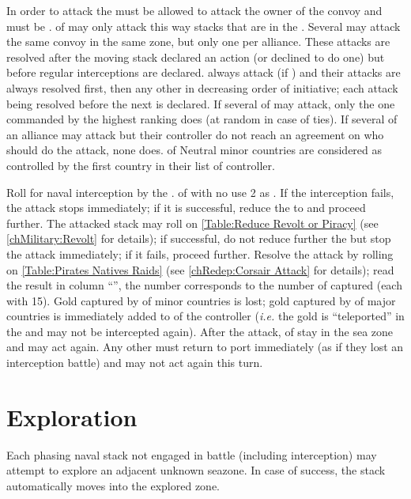 In order to attack the \corsaire must be allowed to attack the owner of the
convoy and must be \Faceplus. \corsaire of \Barbaresques may only attack this
way stacks that are in the . Several \corsaire may attack
the same convoy in the same zone, but only one per alliance. These attacks are
resolved after the moving stack declared an action (or declined to do one) but
before regular interceptions are declared.  \corsaire always
attack (if \Faceplus) and their attacks are always resolved first, then any
other in decreasing order of initiative; each attack being resolved before the
next is declared. If several \corsaire of  may attack, only the
one commanded by the highest ranking \LeaderA does (at random in case of
ties). If several \corsaire of an alliance may attack but their controller do
not reach an agreement on who should do the attack, none does. \corsaire of
Neutral minor countries are considered as controlled by the first country in
their list of controller.

\bparag Roll for naval interception by the \corsaire. \corsaire of
 with no \LeaderA use 2 as \Man.
\bparag If the interception fails, the attack stops immediately; if it is
successful, reduce the \corsaire to \Facemoins and proceed further.
\bparag The attacked stack may roll on \ref{Table:Reduce Revolt or Piracy}
(see \ref{chMilitary:Revolt} for details); if successful, do not reduce
further the \corsaire but stop the attack immediately; if it fails, proceed
further.
\bparag Resolve the attack by rolling on \ref{Table:Pirates Natives Raids}
(see \ref{chRedep:Corsair Attack} for details); read the result in column
``\TradeFLEET\faceplus'', the number corresponds to the number of \NTD
captured (each with 15\ducats).
\bparag Gold captured by \corsaire of minor countries is lost; gold captured by
\corsaire of major countries is immediately added to
 of the controller (\emph{i.e.} the gold
is ``teleported'' in the \RT and may not be intercepted again).
\bparag After the attack, \corsaire of  stay in the sea zone and
may act again. Any other \corsaire must return to port immediately (as if they
lost an interception battle) and may not act again this turn.

\section{Exploration}\label{chMilitary:Discoveries}
Each phasing naval stack not engaged in battle (including interception) may
attempt to explore an adjacent unknown seazone. In case of success, the stack
automatically moves into the explored zone.

